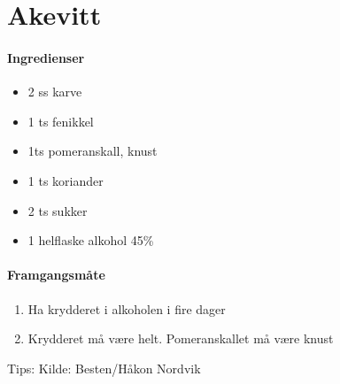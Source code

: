 \section{Akevitt}
\label{akevitt}


\paragraph{Ingredienser}
\begin{itemize}[noitemsep]
	\item 2 ss karve
	\item 1 ts fenikkel
	\item 1ts pomeranskall, knust
	\item 1 ts koriander
	\item 2 ts sukker
	\item 1 helflaske alkohol 45\%
\end{itemize}

\paragraph{Framgangsmåte}
\begin{enumerate}[noitemsep]
	\item Ha krydderet i alkoholen i fire dager
	\item Krydderet må være helt. Pomeranskallet må være knust
\end{enumerate}

Tips:
Kilde: Besten/Håkon Nordvik
